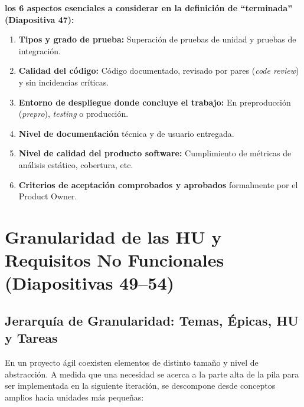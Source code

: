 \textbf{ los 6 aspectos esenciales a considerar en la definición de ``terminada'' (Diapositiva 47):}
\begin{enumerate}[label=\textbf{\arabic*.}, itemsep=2pt]
    \item \textbf{Tipos y grado de prueba:} Superación de pruebas de unidad y pruebas de integración.
    \item \textbf{Calidad del código:} Código documentado, revisado por pares (\textit{code review}) y sin incidencias críticas.
    \item \textbf{Entorno de despliegue donde concluye el trabajo:} En preproducción (\textit{prepro}), \textit{testing} o producción.
    \item \textbf{Nivel de documentación} técnica y de usuario entregada.
    \item \textbf{Nivel de calidad del producto software:} Cumplimiento de métricas de análisis estático, cobertura, etc.
    \item \textbf{Criterios de aceptación comprobados y aprobados} formalmente por el Product Owner.
\end{enumerate}

\section{Granularidad de las HU y Requisitos No Funcionales (Diapositivas 49--54)}

\subsection{Jerarquía de Granularidad: Temas, Épicas, HU y Tareas}

En un proyecto ágil coexisten elementos de distinto tamaño y nivel de abstracción. A medida que una necesidad se acerca a la parte alta de la pila para ser implementada en la siguiente iteración, se descompone desde conceptos amplios hacia unidades más pequeñas:

